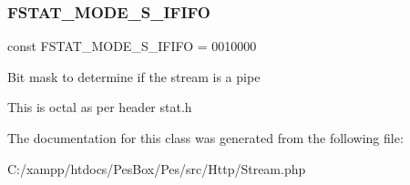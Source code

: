 \subsubsection{\texorpdfstring{F\+S\+T\+A\+T\+\_\+\+M\+O\+D\+E\+\_\+\+S\+\_\+\+I\+F\+I\+FO}{FSTAT\_MODE\_S\_IFIFO}}
{\footnotesize\ttfamily const F\+S\+T\+A\+T\+\_\+\+M\+O\+D\+E\+\_\+\+S\+\_\+\+I\+F\+I\+FO = 0010000}

Bit mask to determine if the stream is a pipe

This is octal as per header stat.\+h 

The documentation for this class was generated from the following file\+:\begin{DoxyCompactItemize}
\item 
C\+:/xampp/htdocs/\+Pes\+Box/\+Pes/src/\+Http/Stream.\+php\end{DoxyCompactItemize}
